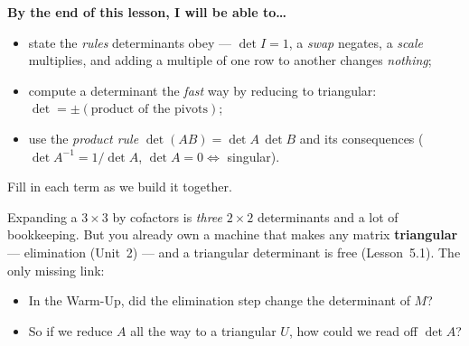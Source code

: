 \documentclass[10pt]{article}
\begin{document}
\namedateperiod

\vspace{0.12in}

\begin{objectivebox}
\textbf{By the end of this lesson, I will be able to\dots}
\begin{itemize}\setlength{\itemsep}{2pt}
  \item state the \emph{rules} determinants obey --- $\det I=1$, a \emph{swap} negates, a \emph{scale} multiplies, and adding a multiple of one row to another changes \emph{nothing};
  \item compute a determinant the \emph{fast} way by reducing to triangular: $\det=\pm(\text{product of the pivots})$;
  \item use the \emph{product rule} $\det(AB)=\det A\,\det B$ and its consequences ($\det A^{-1}=1/\det A$, $\det A=0\Leftrightarrow$ singular).
\end{itemize}
\end{objectivebox}

\vspace{0.06in}

\begin{vocabbox}
\small
Fill in each term as we build it together.
\vspace{2pt}
\end{vocabbox}

\begin{hookbox}
Expanding a $3\times3$ by cofactors is \emph{three} $2\times2$ determinants and a lot of bookkeeping.
But you already own a machine that makes any matrix \textbf{triangular} --- elimination (Unit~2) --- and
a triangular determinant is free (Lesson~5.1). The only missing link:
\begin{itemize}\setlength{\itemsep}{1pt}
  \item In the Warm-Up, did the elimination step change the determinant of $M$? \writeline
  \item So if we reduce $A$ all the way to a triangular $U$, how could we read off $\det A$? \writeline
\end{itemize}
\end{hookbox}
\end{document}
